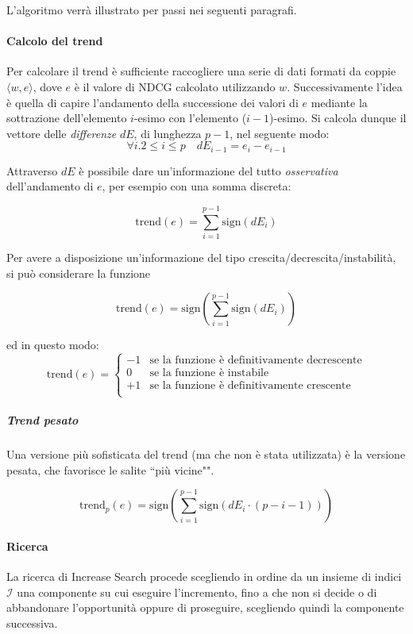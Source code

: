 L'algoritmo verrà illustrato per passi nei seguenti paragrafi.

\paragraph{Calcolo del trend}
Per calcolare il trend è sufficiente raccogliere una serie di dati formati
da coppie $\langle w, e\rangle$, dove $e$ è il valore di NDCG calcolato
utilizzando $w$. Successivamente l'idea è quella di capire
l'andamento della successione dei valori di $e$ mediante
la sottrazione dell'elemento $i$-esimo con l'elemento ($i-1$)-esimo.
Si calcola dunque il vettore delle \textit{differenze} $dE$, di lunghezza $p-1$, nel seguente modo:
$$
\forall{i.2 \leq i \leq p} \quad dE_{i-1} = e_{i} - e_{i-1}
$$

Attraverso $dE$ è possibile dare un'informazione del tutto
\textit{osservativa} dell'andamento di $e$, per esempio
con una somma discreta:

$$
\text{trend}(e) = \sum_{i=1}^{p-1} \text{sign}(dE_i)
$$

Per avere a disposizione un'informazione del tipo crescita/decrescita/instabilità,
si può considerare la funzione

$$
\text{trend}(e) = \text{sign}\left(\sum_{i=1}^{p-1} \text{sign}(dE_i)\right)
$$

ed in questo modo:
$$
\text{trend}(e) =
\begin{cases}
-1 & \text{se la funzione è definitivamente decrescente} \\
0 & \text{se la funzione è instabile} \\
+1 & \text{se la funzione è definitivamente crescente} \\
\end{cases}
$$

\subparagraph{Trend pesato}
Una versione più sofisticata del trend (ma che non è stata utilizzata)
è la versione pesata, che favorisce le salite ``più vicine"".

$$
\text{trend}_p(e) = \text{sign}\left(\sum_{i=1}^{p-1} \text{sign}\left(dE_i \cdot (p-i-1)\right)\right)
$$


\paragraph{Ricerca}
La ricerca di Increase Search procede scegliendo in ordine da
un insieme di indici $\mathcal{I}$ una componente su cui eseguire
l'incremento, fino a che non si decide o di abbandonare
l'opportunità oppure di proseguire, scegliendo quindi la componente successiva.

